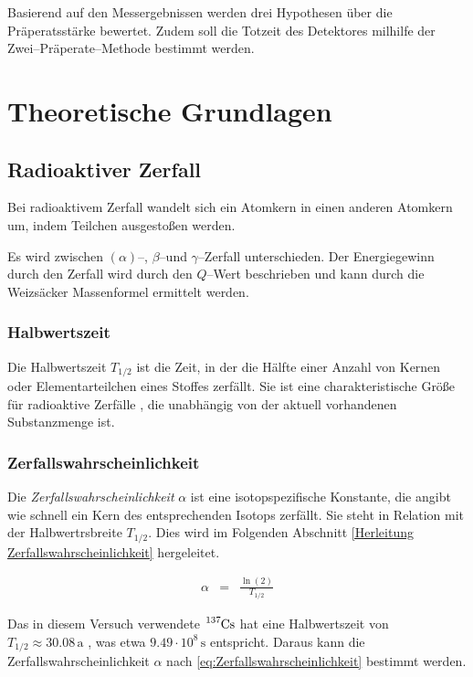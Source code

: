\documentclass[12pt,a4paper]{scrartcl}
\numberwithin{equation}{section} %
\renewcommand{\[}{} %
\renewcommand{\]}{\noindent} %
\begin{document}
Basierend auf den Messergebnissen werden drei Hypothesen über die Präperatsstärke bewertet. Zudem soll die Totzeit des Detektores milhilfe der Zwei--Präperate--Methode bestimmt werden.

\clearpage
\hypertarget{theoretische-grundlagen}{%
\section{Theoretische Grundlagen}\label{theoretische-grundlagen}}
\hypertarget{Radioaktiver Zerfall}{\subsection{Radioaktiver Zerfall}\label{Radioaktiver Zerfall}}
Bei radioaktivem Zerfall wandelt sich ein Atomkern in einen anderen Atomkern um, indem Teilchen ausgestoßen werden.

Es wird zwischen $(\alpha)$--, $\beta$--und $\gamma$--Zerfall unterschieden. Der Energiegewinn durch den Zerfall wird durch den $Q$--Wert beschrieben und kann durch die Weizsäcker Massenformel ermittelt werden.

\hypertarget{Halbwertszeit}{\subsubsection{Halbwertszeit}\label{Halbwertszeit}}
Die Halbwertszeit $T_{1/2}$ ist die Zeit, in der die Hälfte einer Anzahl von Kernen oder Elementarteilchen eines Stoffes zerfällt. Sie ist eine charakteristische Größe für radioaktive Zerfälle , die unabhängig von der aktuell vorhandenen Substanzmenge ist. \cite{Halbwertszeit}

\hypertarget{Zerfallswahrscheinlichkeit}{\subsubsection{Zerfallswahrscheinlichkeit}\label{Zerfallswahrscheinlichkeit}}
Die \emph{Zerfallswahrscheinlichkeit} $\alpha$ ist eine isotopspezifische Konstante, die angibt wie schnell ein Kern des entsprechenden Isotops zerfällt. Sie steht in Relation mit der Halbwertrsbreite $T_{1/2}$. Dies wird im Folgenden  Abschnitt \ref{Herleitung Zerfallswahrscheinlichkeit} hergeleitet.

\begin{eqnarray}
	\alpha &=& \frac{\ln{(2)}}{T_{1/2}} \label{eq:Zerfallswahrscheinlichkeit}
\end{eqnarray}

\noindent
Das in diesem Versuch verwendete $\ce{^{137}Cs}$ hat eine Halbwertszeit von $T_{1/2}\approx30.08\mathrm{\,a}$ \cite{Chart of Nuclides}, was etwa $9.49 \cdot 10^8 \mathrm{\,s}$ entspricht. Daraus kann die Zerfallswahrscheinlichkeit $\alpha$ nach \eqref{eq:Zerfallswahrscheinlichkeit} bestimmt werden.
\end{document}
